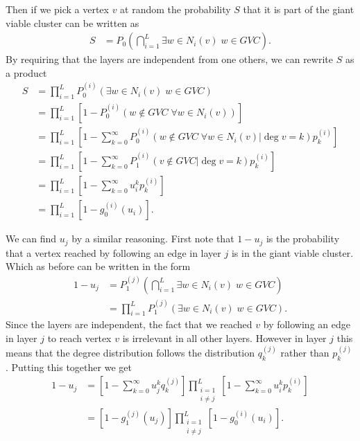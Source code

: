 \documentclass[
11pt, %
english, %
singlespacing, %
nolistspacing, %
liststotoc, %
headsepline, %
]{MastersDoctoralThesis} %
\begin{document}
Then if we pick a vertex $v$ at random the probability $S$ that it is part of the giant viable cluster can be written as
\begin{align}
	S &= P_0\left(\bigcap_{i = 1}^{L} \exists w \in N_i(v) \; w \in GVC \right).
\end{align}
By requiring that the layers are independent from one others, we can rewrite $S$ as a product
\begin{align}
	S &= \prod_{i = 1}^{L}  P_0^{(i)}\left(\exists w \in N_i(v) \; w \in GVC\right) \\
		&=\prod_{i = 1}^{L}  \left[1 - P_0^{(i)}\left(w \notin GVC \; \forall w \in N_i(v)\right) \right] \\
		&=\prod_{i = 1}^{L}  \left[1 - \sum_{k = 0}^{\infty} P_0^{(i)}\left(w \notin GVC \; \forall w \in N_i(v) | \deg{v} = k \right) p^{(i)}_k \right] \\
		&=\prod_{i = 1}^{L}  \left[1 - \sum_{k = 0}^{\infty} P_1^{(i)}\left(v \notin GVC | \deg{v} = k \right) p^{(i)}_k \right] \\
		&=\prod_{i = 1}^{L}  \left[1 - \sum_{k = 0}^{\infty} u_i^k p^{(i)}_k \right] \\
		&=\prod_{i = 1}^{L}  \left[1 - g_0^{(i)}(u_i) \right].\label{Multiplex GCC size final}
\end{align}

We can find $u_j$ by a similar reasoning. First note that $1 - u_j$ is the probability that a vertex reached by following an edge in layer $j$ is in the giant viable cluster. Which as before can be written in the form
\begin{align}
	1 - u_j &= P_1^{(j)}\left(\bigcap_{i = 1}^{L} \exists w \in N_i(v) \; w \in GVC\right)\\
	&= \prod_{i = 1}^{L}  P_1^{(j)}\left(\exists w \in N_i(v) \; w \in GVC \right).
\end{align}
Since the layers are independent, the fact that we reached $v$ by following an edge in layer $j$ to reach vertex $v$ is irrelevant in all other layers. However in layer $j$ this means that the degree distribution follows the distribution $q_k^{(j)}$ rather than $p_k^{(j)}$. Putting this together we get
\begin{align}
	1 - u_j &= \left[1 - \sum_{k = 0}^{\infty} u_j^k q_k^{(j)} \right] \prod_{\substack{i = 1 \\ i \neq j}}^{L}  \left[1 - \sum_{k = 0}^{\infty} u_i^k p^{(i)}_k \right] \\
	&= \left[1 - g_1^{(j)}(u_j) \right] \prod_{\substack{i = 1 \\ i \neq j}}^{L}  \left[1 - g_0^{(i)}(u_i) \right]. \label{Multiplex u final}
\end{align}
\end{document}
